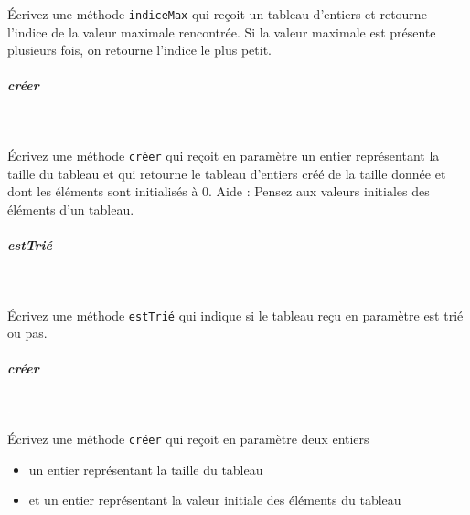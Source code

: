 \documentclass[11pt,a4paper]{article}
\begin{document}
					\'Ecrivez une m\'ethode 
					\verb|indiceMax|
					qui re\c coit un tableau d'entiers
					et retourne l'indice de la valeur maximale rencontr\'ee.
					Si la valeur maximale est pr\'esente plusieurs fois,
					on retourne l'indice le plus petit.
				
            \par
        
			
		\subparagraph{cr\'eer} 
		
					\textcolor{white}{.} \par
				
            \par
        
					\'Ecrivez une m\'ethode 
					\verb|créer| 
					qui re\c coit en param\`etre un entier repr\'esentant 
					la taille du tableau 
					et qui retourne le tableau d'entiers 
					cr\'e\'e de la taille donn\'ee 
					et dont les \'el\'ements sont initialis\'es \`a 0.
					Aide : Pensez aux valeurs initiales
					des \'el\'ements d'un tableau.
				
            \par
        
			
		\subparagraph{estTri\'e} 
		
					\textcolor{white}{.} \par
				
            \par
        
					\'Ecrivez une m\'ethode 
					\verb|estTrié|
					qui indique si le tableau re\c cu
					en param\`etre est tri\'e ou pas.
				
            \par
        
			
		\subparagraph{cr\'eer} 
		
					\textcolor{white}{.} \par
				
            \par
        
					\'Ecrivez une m\'ethode 
					\verb|créer| 
					qui re\c coit en param\`etre deux entiers
					
					\begin{itemize}
				
			\item un entier repr\'esentant la taille du tableau
			\item et un entier repr\'esentant la valeur initiale des \'el\'ements du tableau
					\end{itemize}
				
\end{document}
